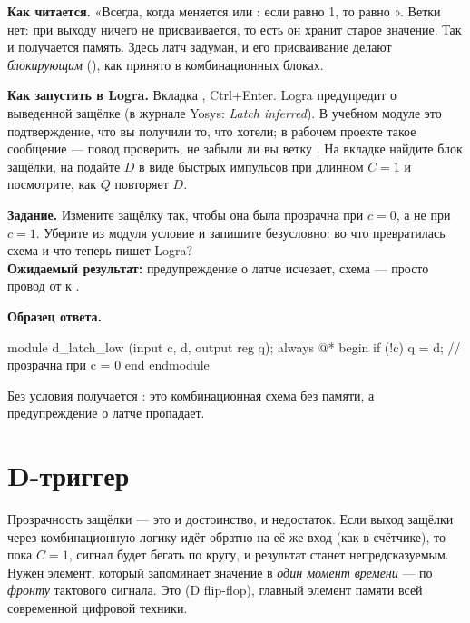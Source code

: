 \textbf{Как читается.} «Всегда, когда меняется  или : если
 равно 1, то  равно ». Ветки  нет: при
 выходу ничего не присваивается, то есть он хранит старое значение.
Так и получается память. Здесь латч задуман, и его присваивание делают
\emph{блокирующим} (\code{=}), как принято в комбинационных блоках.

\textbf{Как запустить в Logra.} Вкладка , Ctrl+Enter. Logra
предупредит о выведенной защёлке (в журнале Yosys: \emph{Latch inferred}). В учебном модуле это
подтверждение, что вы получили то, что хотели; в рабочем проекте такое
сообщение --- повод проверить, не забыли ли вы ветку . На вкладке
 найдите блок защёлки, на  подайте $D$ в виде
быстрых импульсов при длинном $C=1$ и посмотрите, как $Q$ повторяет $D$.

\begin{diybox}
\textbf{Задание.}  Измените защёлку так, чтобы она была прозрачна
при $c=0$, а не при $c=1$.  Уберите из модуля условие и запишите
 безусловно: во что превратилась схема и что теперь пишет
Logra?\\
\textbf{Ожидаемый результат:} предупреждение о латче исчезает, схема --- просто
провод от  к .
\end{diybox}

\textbf{Образец ответа.}
\begin{vcode}
module d_latch_low (input c, d, output reg q);
    always @* begin
        if (!c) q = d;       // прозрачна при c = 0
    end
endmodule
\end{vcode}
Без условия получается : это комбинационная схема без
памяти, а предупреждение о латче пропадает.

\section{D-триггер}

Прозрачность защёлки --- это и достоинство, и недостаток. Если выход защёлки
через комбинационную логику идёт обратно на её же вход (как в счётчике), то
пока $C=1$, сигнал будет бегать по кругу, и результат станет непредсказуемым.
Нужен элемент, который запоминает значение в \emph{один момент времени} ---
по \emph{фронту} тактового сигнала. Это  (D flip-flop),
главный элемент памяти всей современной цифровой техники.

